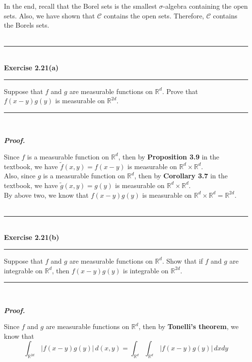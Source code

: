 \documentclass[a4paper,11pt]{article}
\begin{document}
	In the end, recall that the Borel sets is the smallest $\sigma$-algebra containing the open sets. Also, we have shown that $\mathcal{C}$ contains the open sets. Therefore, $\mathcal{C}$ contains the Borels sets.\\\\



\begin{flushleft}
	\rule[-0.5ex]{17cm}{2pt}\\
		\textbf{Exercise 2.21(a)}\\
	\rule[1.5ex]{17cm}{0.5pt}
		Suppose that $f$ and $g$ are measurable functions on $\mathbb{R}^d$. Prove that $f(x - y)g(y)$ is measurable on $\mathbb{R}^{2d}$.
	\rule[1.0ex]{17cm}{0.5pt}\
\end{flushleft}

\textbf{\textit{Proof.}}

Since $f$ is a measurable function on $\mathbb{R}^d$, then by \textbf{Proposition 3.9} in the textbook, we have	$\tilde{f}(x, y) = f(x - y)$ is measurable on $\mathbb{R}^d \times \mathbb{R}^d$.\\

Also, since $g$ is a measurable function on $\mathbb{R}^d$, then by \textbf{Corollary 3.7} in the textbook, we have $\tilde{g}(x, y) = g(y)$ is measurable on $\mathbb{R}^d \times \mathbb{R}^d$.\\

By above two, we know that $f(x - y)g(y)$ is measurable on $\mathbb{R}^d \times \mathbb{R}^d = \mathbb{R}^{2d}$.\\\\






\begin{flushleft}
	\rule[-0.5ex]{17cm}{2pt}\\
		\textbf{Exercise 2.21(b)}\\
	\rule[1.5ex]{17cm}{0.5pt}
		Suppose that $f$ and $g$ are measurable functions on $\mathbb{R}^d$. Show that if $f$ and $g$ are integrable on $\mathbb{R}^d$, then $f(x - y)g(y)$ is integrable on $\mathbb{R}^{2d}$.
	\rule[1.0ex]{17cm}{0.5pt}\
\end{flushleft}

\textbf{\textit{Proof.}}

Since $f$ and $g$ are measurable functions on $\mathbb{R}^d$, then by \textbf{Tonelli's theorem}, we know that
	$$\int_{\mathbb{R}^{2d}}\,|f(x - y)g(y)|\,d(x,y)
	= \int_{\mathbb{R}^{d}} \int_{\mathbb{R}^{d}}\,|f(x - y)g(y)|\,dxdy$$
\end{document}

